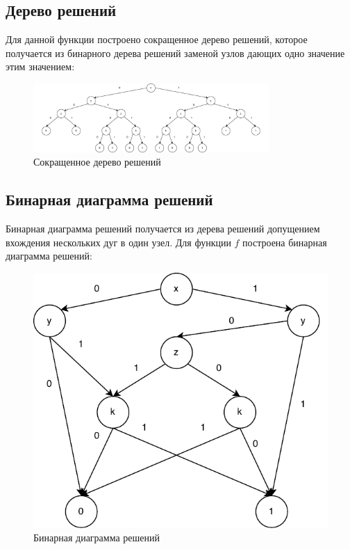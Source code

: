\documentclass[a4paper]{article}
\theoremstyle{plain}
\theoremstyle{definition*}
\theoremstyle{remark}
\begin{document}
\subsection{Дерево решений}
Для данной функции построено сокращенное дерево решений, которое 
получается из бинарного дерева решений заменой узлов дающих одно 
значение этим значением: 

\begin{figure}[H]
    \centering
    \includegraphics[width=0.8\textwidth]{pics/ShortTree.pdf}
    \caption{Сокращенное дерево решений}
\end{figure}

\subsection{Бинарная диаграмма решений}
Бинарная диаграмма решений получается из дерева решений допущением
вхождения нескольких дуг в один узел. Для функции $\displaystyle f$ 
построена бинарная диаграмма решений:

\vspace{1 cm}
\begin{figure}[H]
    \centering
    \includegraphics[]{pics/BDR-2.pdf}
    \caption{Бинарная диаграмма решений}
    \label{fig:}
\end{figure}
\end{document}
